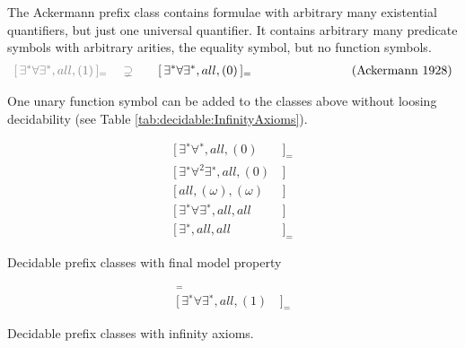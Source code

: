 \begin{example}\label{ex:ackermann}
	The Ackermann prefix class contains formulae with arbitrary many existential quantifiers, 
	but just one universal quantifier. It contains arbitrary many predicate symbols
	with arbitrary arities, the equality symbol, but no function symbols. 
	\begin{gather*}
	{\colG [\,\exists^*\forall\exists^*,all,(1)\,]_=
	\quad\supsetneq}\qquad
	[\,\exists^*\forall\exists^*,all,(0) \,]_{=}\qquad\qquad\qquad 
	\tag{Ackermann 1928}
	\end{gather*}
\end{example}

\begin{remark}
	One unary function symbol can be added to the classes above 
	without loosing decidability (see Table \ref{tab:decidable:InfinityAxioms}).
\end{remark}


\begin{table}[hbt]
	\begin{align*}
	[\,\exists^{∗}\forall^{∗}, all, (0)&\,]_{=} \tag{Bernays, Schönfinkel 1928, Ramsey 1932}
	\\
	[\,\exists^{∗}\forall^2\exists^{∗} , all, (0)&\,] \tag{Gödel 1932, Kalmár 1933, Schütte 1934}
	\\
	[\,all, (\omega), (\omega)&\,] \tag{Löb 1967, Gurevich 1969}
	\\
	[\,\exists^{∗}\forall\exists^{∗}, all, all&\,] \tag{Gurevich 1973}
	\\
	[\,\exists^{∗}, all, all&\,]_{=} \tag{Gurevich 1976}
	\end{align*}
	\caption[Decidable prefix classes]{Decidable prefix classes with final model property }
	\label{tab:decidedable:FiniteModelProperty}
\end{table}

\begin{table}[hbt]
	\begin{align*}
	[\,all, (\omega), (1)&\,]_{=} \tag{Rabin 1969} 
	\\
	[\,\exists^{∗}\forall\exists^{∗}, all, (1)&\,]_{=} \tag{Shelah 1977}
	\end{align*}
	\caption[Decidable prefix classes]{Decidable prefix classes with infinity axioms. }
	\label{tab:decidable:InfinityAxioms}
\end{table}

